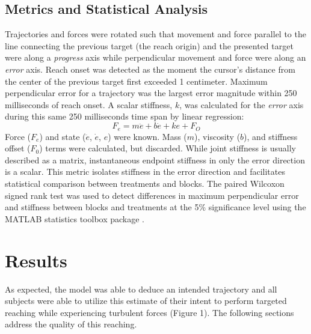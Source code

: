 \documentclass{frontiersSCNS} %
\begin{document}
\begin{methods}
\subsection{Metrics and Statistical Analysis}
Trajectories and forces were rotated such that movement and force parallel to the line connecting the previous target (the reach origin) and the presented target were along a \textit{progress} axis while perpendicular movement and force were along an \textit{error} axis. Reach onset was detected as the moment the cursor's distance from the center of the previous target first exceeded 1 centimeter. Maximum perpendicular error for a trajectory was the largest error magnitude within 250 milliseconds of reach onset. A scalar stiffness, $k$, was calculated for the \textit{error} axis during this same 250 milliseconds time span by linear regression:
\begin{equation}
F_e=m\ddot{e}+b\dot{e}+ke+F_O
\end{equation}
Force ($F_e$) and state ($\ddot{e}$, $\dot{e}$, $e$) were known. Mass ($m$), viscosity ($b$), and stiffness offset ($F_0$) terms were calculated, but discarded. While joint stiffness is usually described as a matrix, instantaneous endpoint stiffness in only the error direction is a scalar. This metric isolates stiffness in the error direction and facilitates statistical comparison between treatments and blocks. The paired Wilcoxon signed rank test was used to detect differences in maximum perpendicular error and stiffness between blocks and treatments at the 5\% significance level using the MATLAB statistics toolbox package \cite{MATLAB:2014}.
\end{methods}


\section{Results}
As expected, the model was able to deduce an intended trajectory and all subjects were able to utilize this estimate of their intent to perform targeted reaching while experiencing turbulent forces (Figure 1). The following sections address the quality of this reaching.
\end{document}
